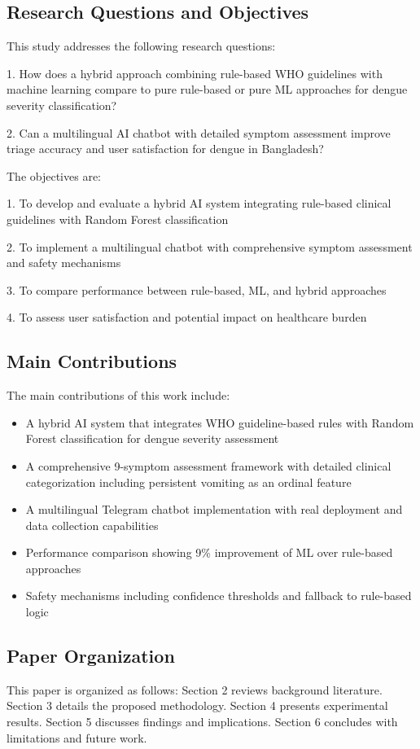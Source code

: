 \documentclass[conference]{IEEEtran}
\begin{document}
\subsection{Research Questions and Objectives}
This study addresses the following research questions:

1. How does a hybrid approach combining rule-based WHO guidelines with machine learning compare to pure rule-based or pure ML approaches for dengue severity classification?

2. Can a multilingual AI chatbot with detailed symptom assessment improve triage accuracy and user satisfaction for dengue in Bangladesh?

The objectives are:

1. To develop and evaluate a hybrid AI system integrating rule-based clinical guidelines with Random Forest classification

2. To implement a multilingual chatbot with comprehensive symptom assessment and safety mechanisms

3. To compare performance between rule-based, ML, and hybrid approaches

4. To assess user satisfaction and potential impact on healthcare burden

\subsection{Main Contributions}
The main contributions of this work include:

\begin{itemize}
\item A hybrid AI system that integrates WHO guideline-based rules with Random Forest classification for dengue severity assessment
\item A comprehensive 9-symptom assessment framework with detailed clinical categorization including persistent vomiting as an ordinal feature
\item A multilingual Telegram chatbot implementation with real deployment and data collection capabilities
\item Performance comparison showing 9\% improvement of ML over rule-based approaches
\item Safety mechanisms including confidence thresholds and fallback to rule-based logic
\end{itemize}

\subsection{Paper Organization}
This paper is organized as follows: Section 2 reviews background literature. Section 3 details the proposed methodology. Section 4 presents experimental results. Section 5 discusses findings and implications. Section 6 concludes with limitations and future work.
\end{document}
